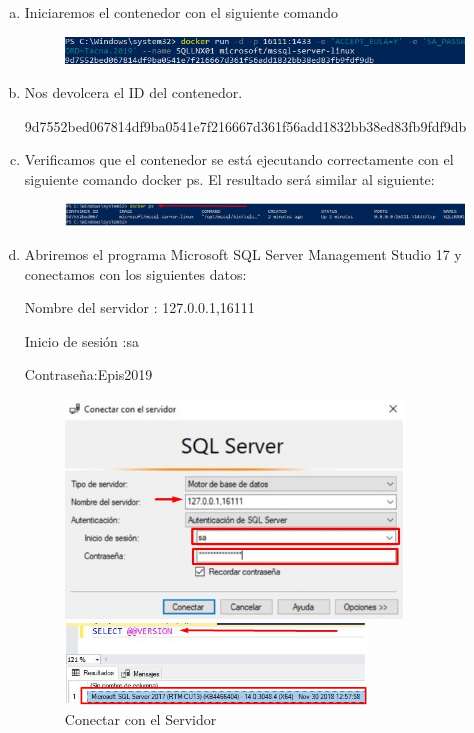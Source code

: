 \documentclass[preprint,12pt]{elsarticle}
\begin{document}
\begin{enumerate}[a)]
\item Iniciaremos el contenedor con el siguiente comando
\begin{figure}[htb]
	\begin{center}
		\includegraphics[width=14cm]{./IMAGENES/Docker07}
	\end{center}
\end{figure}

\item Nos devolcera el ID del contenedor.
\begin{center}
9d7552bed067814df9ba0541e7f216667d361f56add1832bb38ed83fb9fdf9db
\end{center}

\item Verificamos que el contenedor se está ejecutando correctamente con el siguiente comando docker ps. El resultado será similar al siguiente:
\begin{figure}[htb]
	\begin{center}
		\includegraphics[width=14cm]{./IMAGENES/Docker08}
	\end{center}
\end{figure}

\item Abriremos el programa Microsoft SQL Server Management Studio 17 y conectamos con los siguientes datos: 
\begin{center}Nombre del servidor : 127.0.0.1,16111\end{center}
\begin{center} Inicio de sesión :sa\end{center}
\begin{center}Contraseña:Epis2019\end{center}
	\begin{figure}[htb]
		\begin{center}
		\includegraphics[width=9cm]{./IMAGENES/Docker13}
		\caption{Conectar con el Servidor}
		\includegraphics[width=8cm]{./IMAGENES/Docker11}
		\end{center}
	\end{figure}


\end{enumerate}
\end{document}
